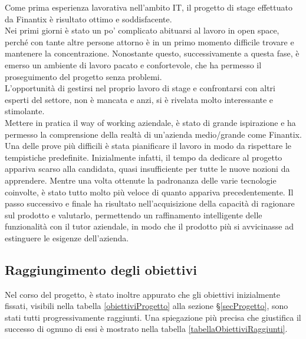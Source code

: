     Come prima esperienza lavorativa nell'ambito IT, il progetto di stage effettuato da Finantix è risultato ottimo e soddisfacente. \\
    Nei primi giorni è stato un po' complicato abituarsi al lavoro in open space, perché con tante altre persone attorno è in un primo momento difficile trovare e mantenere la concentrazione.
    Nonostante questo, successivamente a questa fase, è emerso un ambiente di lavoro pacato e confortevole, che ha permesso il proseguimento del progetto senza problemi. \\
    L'opportunità di gestirsi nel proprio lavoro di stage e confrontarsi con altri esperti del settore, non è mancata e anzi, si è rivelata molto interessante e stimolante. \\
    Mettere in pratica il way of working aziendale, è stato di grande ispirazione e ha permesso la comprensione della realtà di un'azienda medio/grande come Finantix. \\
    Una delle prove più difficili è stata pianificare il lavoro in modo da rispettare le tempistiche predefinite.
    Inizialmente infatti, il tempo da dedicare al progetto appariva scarso alla candidata, quasi insufficiente per tutte le nuove nozioni da apprendere.
    Mentre una volta ottenute la padronanza delle varie tecnologie coinvolte, è stato tutto molto più veloce di quanto appariva precedentemente.
    Il passo successivo e finale ha risultato nell'acquisizione della capacità di ragionare sul prodotto e valutarlo, permettendo un raffinamento intelligente delle funzionalità con il tutor aziendale, in modo che il prodotto più si avvicinasse ad estinguere le esigenze dell'azienda.

    \subsection{Raggiungimento degli obiettivi}
    Nel corso del progetto, è stato inoltre appurato che gli obiettivi inizialmente fissati, visibili nella tabella \ref{obiettiviProgetto} alla sezione \S\ref{secProgetto}, sono stati tutti progressivamente raggiunti.
    Una spiegazione più precisa che giustifica il successo di ognuno di essi è mostrato nella tabella \ref{tabellaObiettiviRaggiunti}.

